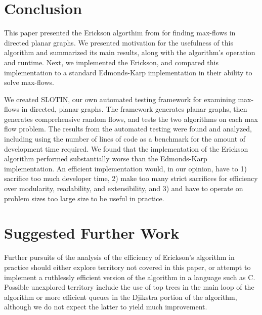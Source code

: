 \documentclass[12pt]{article}
\begin{document}
\section{Conclusion}

This paper presented the Erickson algorthim from \cite{erickson2010} for finding max-flows in directed planar graphs. We presented motivation for the usefulness of this algorithm and summarized its main results, along with the algorithm's operation and runtime. Next, we implemented the Erickson, and compared this implementation to a standard Edmonds-Karp implementation in their ability to solve max-flows. 

We created SLOTIN, our own automated testing framework for examining max-flows in directed, planar graphs. The framework generates planar graphs, then generates comprehensive random flows, and tests the two algorithms on each max flow problem.  The results from the automated testing were found and analyzed, including using the number of lines of code as a benchmark for the amount of development time required. We found that the implementation of the Erickson algorithm performed substantially worse than the Edmonds-Karp implementation.  An efficient implementation would, in our opinion, have to 1) sacrifice too much developer time, 2) make too many strict sacrifices for efficiency over modularity, readability, and extensibility, and 3) and have to operate on problem sizes too large size to be useful in practice.

\section{Suggested Further Work}
Further pursuits of the analysis of the efficiency of Erickson's algorithm in practice should either explore territory not covered in this paper, or attempt to implement a ruthlessly efficient version of the algorithm in a language such as C.  Possible unexplored territory include the use of top trees in the main loop of the algorithm or more efficient queues in the Djikstra portion of the algorithm, although we do not expect the latter to yield much improvement.

\newpage
\end{document}
